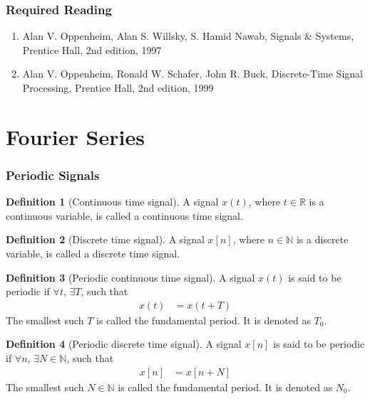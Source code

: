 \documentclass[titlepage, fleqn, a4paper, 12pt, twoside]{article}
\theoremstyle{definition}
\newtheorem{definition}{Definition}
\theoremstyle{theorem}
\begin{document}
\section{Required Reading}

\begin{enumerate}
	\item Alan V. Oppenheim, Alan S. Willsky, S. Hamid Nawab, Signals \& Systems, Prentice Hall, 2nd edition, 1997
	\item Alan V. Oppenheim, Ronald W. Schafer, John R. Buck, Discrete-Time Signal Processing, Prentice Hall, 2nd edition, 1999
\end{enumerate}

\clearpage
{}

\part{Fourier Series}

\section{Periodic Signals}

\begin{definition}[Continuous time signal]
	A signal $x(t)$, where $t \in \mathbb{R}$ is a continuous variable, is called a continuous time signal.
\end{definition}

\begin{definition}[Discrete time signal]
	A signal $x[n]$, where $n \in \mathbb{N}$ is a discrete variable, is called a discrete time signal.
\end{definition}

\begin{definition}[Periodic continuous time signal]
	A signal $x(t)$ is said to be periodic if $\forall t$, $\exists T$, such that
	\begin{align*}
		x(t) & = x(t + T)
	\end{align*}
	The smallest such $T$ is called the fundamental period.
	It is denoted as $T_0$.
\end{definition}

\begin{definition}[Periodic discrete time signal]
	A signal $x[n]$ is said to be periodic if $\forall n$, $\exists N \in \mathbb{N}$, such that
	\begin{align*}
		x[n] & = x[n + N]
	\end{align*}
	The smallest such $N \in \mathbb{N}$ is called the fundamental period.
	It is denoted as $N_0$.
\end{definition}
\end{document}
